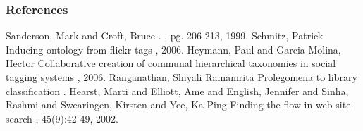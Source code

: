 \documentclass{beamer}
\begin{document}
\begin{frame}
\tiny
    \frametitle{References}
  \begin{thebibliography}{10}    
  \beamertemplatebookbibitems
  Sanderson, Mark and Croft, Bruce
    .
    , pg. 206-213, 1999.
  \beamertemplatearticlebibitems
  Schmitz, Patrick
    \newblock Inducing ontology from flickr tags
    , 2006.
  \beamertemplatearticlebibitems
  Heymann, Paul and Garcia-Molina, Hector
    \newblock Collaborative creation of communal hierarchical taxonomies in social tagging systems
    , 2006.
  \beamertemplatearticlebibitems
  Ranganathan, Shiyali Ramamrita
    \newblock Prolegomena to library classification
    .
  \beamertemplatearticlebibitems
  Hearst, Marti and Elliott, Ame and English, Jennifer and Sinha, Rashmi and Swearingen, Kirsten and Yee, Ka-Ping
    \newblock Finding the flow in web site search
    , 45(9):42-49, 2002.
  \end{thebibliography}
\end{frame}
\end{document}
